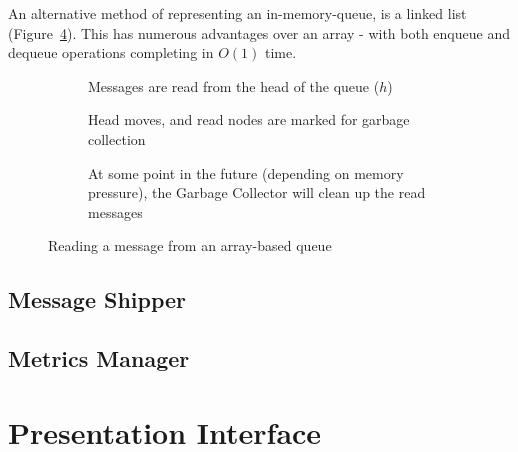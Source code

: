 An alternative method of representing an in-memory-queue, is a linked list (Figure~\ref{fig:tikz:queueLinkedList}).
This has numerous advantages over an array - with both enqueue and dequeue operations completing in $O(1)$ time.

\begin{figure}[ht]
  \centering
  \begin{subfigure}[b]{\textwidth}
    \centering
    
    \caption{Messages are read from the head of the queue ($h$)}
    \label{fig:tikz:queueLinkedListInitial}
  \end{subfigure}

  \begin{subfigure}[b]{\textwidth}
    \centering
    
    \caption{Head moves, and read nodes are marked for garbage collection}
    \label{fig:tikz:queueLinkedListHeadRead}
  \end{subfigure}

  \begin{subfigure}[b]{\textwidth}
    \centering
    
    \caption{At some point in the future (depending on memory pressure),
             the Garbage Collector will clean up the read messages}
    \label{fig:tikz:queueLinkedListGCRun}
  \end{subfigure}
  \caption{Reading a message from an array-based queue}
  \label{fig:tikz:queueLinkedList}
\end{figure}


\subsection{Message Shipper}
\label{sub:Message Shipper}


\subsection{Metrics Manager}
\label{sub:Metrics Manager}


\section{Presentation Interface}
\label{sec:Presentation Interface}

